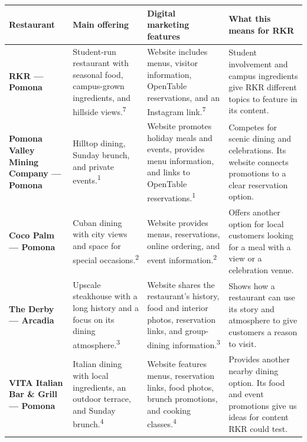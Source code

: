 \documentclass[
  12pt,
  letterpaper,
  DIV=11,
  numbers=noendperiod]{scrartcl}
\begin{document}
\begin{longtable}[]{@{}
  >{\raggedright\arraybackslash}p{}
  >{\raggedright\arraybackslash}p{}
  >{\raggedright\arraybackslash}p{}
  >{\raggedright\arraybackslash}p{}@{}}
\toprule\noalign{}
\begin{minipage}[b]{\linewidth}\raggedright
Restaurant
\end{minipage} & \begin{minipage}[b]{\linewidth}\raggedright
Main offering
\end{minipage} & \begin{minipage}[b]{\linewidth}\raggedright
Digital marketing features
\end{minipage} & \begin{minipage}[b]{\linewidth}\raggedright
What this means for RKR
\end{minipage} \\
\midrule\noalign{}
\endhead
\bottomrule\noalign{}
\endlastfoot
\textbf{RKR --- Pomona} & Student-run restaurant with seasonal food,
campus-grown ingredients, and hillside views.\textsuperscript{7} &
Website includes menus, visitor information, OpenTable reservations, and
an Instagram link.\textsuperscript{7} & Student involvement and campus
ingredients give RKR different topics to feature in its content. \\
\textbf{Pomona Valley Mining Company --- Pomona} & Hilltop dining,
Sunday brunch, and private events.\textsuperscript{1} & Website promotes
holiday meals and events, provides menu information, and links to
OpenTable reservations.\textsuperscript{1} & Competes for scenic dining
and celebrations. Its website connects promotions to a clear reservation
option. \\
\textbf{Coco Palm --- Pomona} & Cuban dining with city views and space
for special occasions.\textsuperscript{2} & Website provides menus,
reservations, online ordering, and event information.\textsuperscript{2}
& Offers another option for local customers looking for a meal with a
view or a celebration venue. \\
\textbf{The Derby --- Arcadia} & Upscale steakhouse with a long history
and a focus on its dining atmosphere.\textsuperscript{3} & Website
shares the restaurant's history, food and interior photos, reservation
links, and group-dining information.\textsuperscript{3} & Shows how a
restaurant can use its story and atmosphere to give customers a reason
to visit. \\
\textbf{VITA Italian Bar \& Grill --- Pomona} & Italian dining with
local ingredients, an outdoor terrace, and Sunday
brunch.\textsuperscript{4} & Website features menus, reservation links,
food photos, brunch promotions, and cooking classes.\textsuperscript{4}
& Provides another nearby dining option. Its food and event promotions
give us ideas for content RKR could test. \\
\end{longtable}
\end{document}
